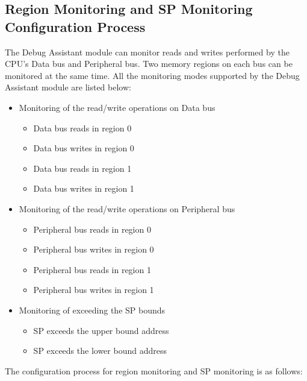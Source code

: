 \documentclass[main\_\_EN.tex]{subfiles}
\begin{document}
\subsection{Region Monitoring and SP Monitoring Configuration Process}

The Debug Assistant module can monitor reads and writes performed by the CPU's Data bus and Peripheral bus. Two memory regions on each bus can be monitored at the same time. All the monitoring modes supported by the Debug Assistant module are listed below:

\begin{itemize}
    \item Monitoring of the read/write operations on Data bus
        \begin{itemize}
            \item Data bus reads in region 0
            \item Data bus writes in region 0
            \item Data bus reads in region 1
            \item Data bus writes in region 1
        \end{itemize}    
    \item Monitoring of the read/write operations on Peripheral bus
        \begin{itemize}
            \item Peripheral bus reads in region 0
            \item Peripheral bus writes in region 0
            \item Peripheral bus reads in region 1
            \item Peripheral bus writes in region 1
        \end{itemize}
    \item  Monitoring of exceeding the SP bounds
        \begin{itemize}
            \item  SP exceeds the upper bound address
            \item SP exceeds the lower bound address
        \end{itemize}
\end{itemize}



The configuration process for region monitoring and SP monitoring is as follows:
\end{document}
